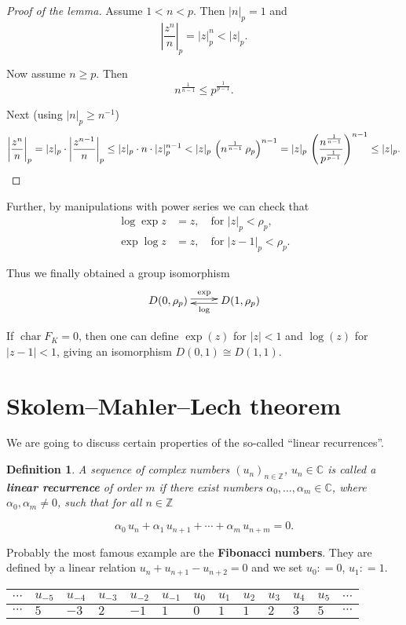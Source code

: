 \documentclass{article}
\newcommand{\term}{\textbf}
\newcommand{\isom}{\cong}
\newcommand{\dfn}{\mathrel{\mathop:}=}
\newcommand{\ZZ}{\mathbb{Z}}
\DeclareMathOperator{\fchar}{char}
\newcommand{\examplesymbol}{$\blacktriangle$}
\renewcommand{\qedsymbol}{$\blacksquare$}
\theoremstyle{myplain}
\theoremstyle{mydefinition}
\newtheorem{definition}[proposition]{Definition}
\newenvironment{example}
  {\pushQED{\qed}\renewcommand{\qedsymbol}{\examplesymbol}\examplex}
  {\popQED\endexamplex}
\begin{document}
\begin{proof}[Proof of the lemma]
  Assume $1 < n < p$. Then $|n|_p = 1$ and
  $$\left|\frac{z^n}{n}\right|_p = |z|_p^n < |z|_p.$$

  Now assume $n \ge p$. Then
  $$n^{\frac{1}{n-1}} \le p^{\frac{1}{p-1}}.$$

  Next (using $|n|_p \ge n^{-1}$)
  \[ \left|\frac{z^n}{n}\right|_p =
    |z|_p \cdot \left|\frac{z^{n-1}}{n}\right|_p \le |z|_p \cdot n \cdot |z|_p^{n-1} <
    |z|_p \, \left(n^{\frac{1}{{n-1}}} \, \rho_p\right)^{n-1} =
    |z|_p \, \left(\frac{n^{\frac{1}{n-1}}}{p^{\frac{1}{p-1}}}\right)^{n-1} \le
    |z|_p. \qedhere \]
\end{proof}

Further, by manipulations with power series we can check that
\begin{align*}
  \log \exp z & = z, \quad \text{for }|z|_p < \rho_p,\\
  \exp \log z & = z, \quad \text{for }|z - 1|_p < \rho_p.
\end{align*}

Thus we finally obtained a group isomorphism
$$\xymatrix{D (0,\rho_p)\ar@<+0.2em>[r]^\exp & D (1, \rho_p)\ar@<+0.2em>[l]^\log}$$

If $\fchar F_K = 0$, then one can define $\exp (z)$ for $|z| < 1$ and $\log (z)$
for $|z - 1| < 1$, giving an isomorphism $D (0,1) \isom D (1,1)$.

\section{Skolem--Mahler--Lech theorem}
\label{section:skolem-mahler-lech}

We are going to discuss certain properties of the so-called ``linear
recurrences''.

\begin{definition}
  A sequence of complex numbers $(u_n)_{n \in \ZZ}$, $u_n \in \mathbb{C}$ is
  called a \term{linear recurrence} of order $m$ if there exist numbers
  $\alpha_0, \ldots, \alpha_m \in \mathbb{C}$, where $\alpha_0, \alpha_m \ne 0$,
  such that for all $n \in \ZZ$

  \[ \alpha_0\,u_n + \alpha_1\,u_{n+1} + \cdots + \alpha_m\,u_{n+m} = 0. \]
\end{definition}

\begin{example}
  Probably the most famous example are the \term{Fibonacci numbers}. They are
  defined by a linear relation $u_n + u_{n+1} - u_{n+2} = 0$ and we set
  $u_0 \dfn 0$, $u_1 \dfn 1$.

  \begin{center}
    \begin{tabular}{x{0.65cm}x{0.65cm}x{0.65cm}x{0.65cm}x{0.65cm}x{0.65cm}x{0.65cm}x{0.65cm}x{0.65cm}x{0.65cm}x{0.65cm}x{0.65cm}x{0.65cm}}
      $\cdots$ & $u_{-5}$ & $u_{-4}$ & $u_{-3}$ & $u_{-2}$ & $u_{-1}$ & $u_0$ & $u_1$ & $u_2$ & $u_3$ & $u_4$ & $u_5$ & $\cdots$ \tabularnewline\hline
      $\cdots$ & $5$ & $-3$ & $2$ & $-1$ & $1$ & $0$ & $1$ & $1$ & $2$ & $3$ & $5$ & $\cdots$
    \end{tabular}
  \end{center}
\end{example}
\end{document}
